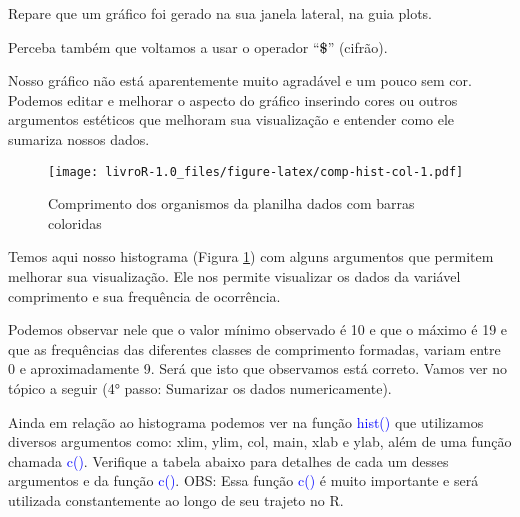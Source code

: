 \documentclass[titlepage, oneside, openany, a4paper]{book}
\newenvironment{Shaded}{\begin{snugshade}}{\end{snugshade}}
\newcommand{\DataTypeTok}[1]{\textcolor[rgb]{0.13,0.29,0.53}{#1}}
\newcommand{\DecValTok}[1]{\textcolor[rgb]{0.00,0.00,0.81}{#1}}
\newcommand{\KeywordTok}[1]{\textcolor[rgb]{0.13,0.29,0.53}{\textbf{#1}}}
\newcommand{\NormalTok}[1]{#1}
\newcommand{\OperatorTok}[1]{\textcolor[rgb]{0.81,0.36,0.00}{\textbf{#1}}}
\newcommand{\StringTok}[1]{\textcolor[rgb]{0.31,0.60,0.02}{#1}}
\begin{document}
Repare que um gráfico foi gerado na sua janela lateral, na guia plots.

Perceba também que voltamos a usar o operador ``\textbf{\$}'' (cifrão).

Nosso gráfico não está aparentemente muito agradável e um pouco sem cor. Podemos editar e melhorar o aspecto do gráfico inserindo cores ou outros argumentos estéticos que melhoram sua visualização e entender como ele sumariza nossos dados.

\begin{Shaded}
\end{Shaded}

\begin{figure}
\centering
\texttt{[image: livroR-1.0\_files/figure-latex/comp-hist-col-1.pdf]}
\caption{\label{fig:comp-hist-col}Comprimento dos organismos da planilha dados com barras coloridas}
\end{figure}

Temos aqui nosso histograma (Figura \ref{fig:comp-hist-col}) com alguns argumentos que permitem melhorar sua visualização. Ele nos permite visualizar os dados da variável comprimento e sua frequência de ocorrência.

Podemos observar nele que o valor mínimo observado é 10 e que o máximo é 19 e que as frequências das diferentes classes de comprimento formadas, variam entre 0 e aproximadamente 9. Será que isto que observamos está correto. Vamos ver no tópico a seguir (4° passo: Sumarizar os dados numericamente).

Ainda em relação ao histograma podemos ver na função \textcolor{blue}{hist()} que utilizamos diversos argumentos como: xlim, ylim, col, main, xlab e ylab, além de uma função chamada \textcolor{blue}{c()}. Verifique a tabela abaixo para detalhes de cada um desses argumentos e da função \textcolor{blue}{c()}. OBS: Essa função \textcolor{blue}{c()} é muito importante e será utilizada constantemente ao longo de seu trajeto no R.
\end{document}
